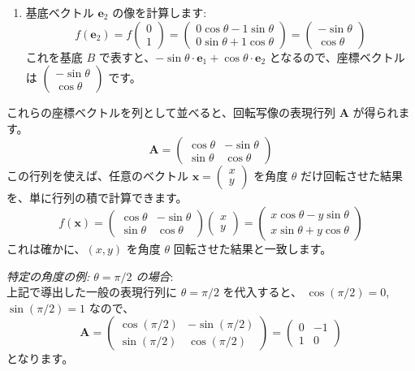\begin{ex}[2次元平面上の回転写像の表現行列]
\begin{enumerate}
\item 基底ベクトル $\bm{e}_2$ の像を計算します:
    \[f(\bm{e}_2) = f\begin{pmatrix} 0 \\ 1 \end{pmatrix} = \begin{pmatrix} 0\cos\theta - 1\sin\theta \\ 0\sin\theta + 1\cos\theta \end{pmatrix} = \begin{pmatrix} -\sin\theta \\ \cos\theta \end{pmatrix}\]
    これを基底 $B$ で表すと、$-\sin\theta \cdot \bm{e}_1 + \cos\theta \cdot \bm{e}_2$ となるので、座標ベクトルは $\begin{pmatrix} -\sin\theta \\ \cos\theta \end{pmatrix}$ です。
\end{enumerate}
これらの座標ベクトルを列として並べると、回転写像の表現行列 $\bm{A}$ が得られます。
\[\bm{A} = \begin{pmatrix} \cos\theta & -\sin\theta \\ \sin\theta & \cos\theta \end{pmatrix}\]
この行列を使えば、任意のベクトル $\bm{x} = \begin{pmatrix} x \\ y \end{pmatrix}$ を角度 $\theta$ だけ回転させた結果を、単に行列の積で計算できます。
\[f(\bm{x}) = \begin{pmatrix} \cos\theta & -\sin\theta \\ \sin\theta & \cos\theta \end{pmatrix} \begin{pmatrix} x \\ y \end{pmatrix} = \begin{pmatrix} x\cos\theta - y\sin\theta \\ x\sin\theta + y\cos\theta \end{pmatrix}\]
これは確かに、$(x,y)$ を角度 $\theta$ 回転させた結果と一致します。\par
\emph{特定の角度の例: $\theta = \pi/2$ の場合}:\\
上記で導出した一般の表現行列に $\theta = \pi/2$ を代入すると、
$\cos(\pi/2) = 0$, $\sin(\pi/2) = 1$ なので、
\[\bm{A} = \begin{pmatrix} \cos(\pi/2) & -\sin(\pi/2) \\ \sin(\pi/2) & \cos(\pi/2) \end{pmatrix} = \begin{pmatrix} 0 & -1 \\ 1 & 0 \end{pmatrix}\]
となります。
\end{ex}

